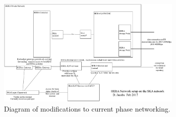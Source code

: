 \documentclass{article}
\begin{document}
\begin{figure}[H]
\includegraphics[width=0.8\textwidth]{HERA_2017_network_organization.png}
\centering
\caption{Diagram of modifications to current phase networking.}
\label{fig:net_org}
\end{figure}
\end{document}
